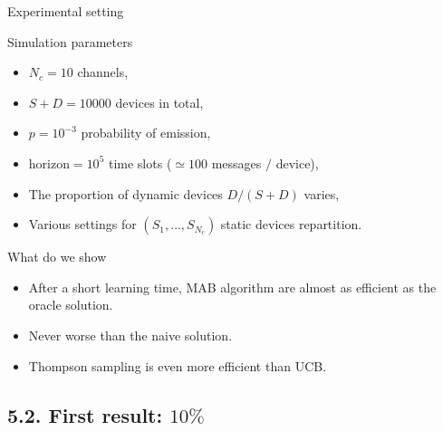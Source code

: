 \documentclass[12pt,english,ignorenonframetext,]{beamer}
\providecommand{\tightlist}{%
  \setlength{\itemsep}{0pt}\setlength{\parskip}{0pt}}
\begin{document}
\begin{frame}{Experimental setting}

\begin{block}{Simulation parameters}

\begin{itemize}
\tightlist
\item
  \(N_c = 10\) channels,
\item
  \(S + D = 10000\) devices in total,
\item
  \(p = 10^{-3}\) probability of emission,
\item
  \(\text{horizon} = 10^5\) time slots (\(\simeq 100\) messages \(/\)
  device),
\item
  The proportion of dynamic devices \(D/(S+D)\) varies,
\item
  Various settings for \((S_1,\dots,S_{N_c})\) static devices
  repartition.
\end{itemize}

\end{block}

\begin{block}{What do we show}

\begin{itemize}
\tightlist
\item
  After a short learning time, MAB algorithm are almost as efficient as
  the oracle solution.
\item
  Never worse than the naive solution.
\item
  Thompson sampling is even more efficient than UCB.
\end{itemize}

\end{block}

\end{frame}



\subsection{\hfill{}5.2. First result: $10\%$\hfill{}}
\end{document}
